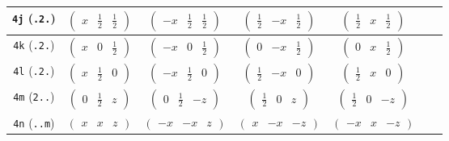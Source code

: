 \documentclass[fleqn,9pt,landscape]{jsarticle}
\begin{document}
\begin{center}
\begin{longtable}{ccccccc}
{\tt 4j} ({\tt .2.}) & $ \begin{pmatrix} x & \frac{1}{2} & \frac{1}{2} \end{pmatrix} $ & $ \begin{pmatrix} - x & \frac{1}{2} & \frac{1}{2} \end{pmatrix} $ & $ \begin{pmatrix} \frac{1}{2} & - x & \frac{1}{2} \end{pmatrix} $ & $ \begin{pmatrix} \frac{1}{2} & x & \frac{1}{2} \end{pmatrix} $ & $  $ & $  $ \\ \hline
{\tt 4k} ({\tt .2.}) & $ \begin{pmatrix} x & 0 & \frac{1}{2} \end{pmatrix} $ & $ \begin{pmatrix} - x & 0 & \frac{1}{2} \end{pmatrix} $ & $ \begin{pmatrix} 0 & - x & \frac{1}{2} \end{pmatrix} $ & $ \begin{pmatrix} 0 & x & \frac{1}{2} \end{pmatrix} $ & $  $ & $  $ \\ \hline
{\tt 4l} ({\tt .2.}) & $ \begin{pmatrix} x & \frac{1}{2} & 0 \end{pmatrix} $ & $ \begin{pmatrix} - x & \frac{1}{2} & 0 \end{pmatrix} $ & $ \begin{pmatrix} \frac{1}{2} & - x & 0 \end{pmatrix} $ & $ \begin{pmatrix} \frac{1}{2} & x & 0 \end{pmatrix} $ & $  $ & $  $ \\ \hline
{\tt 4m} ({\tt 2..}) & $ \begin{pmatrix} 0 & \frac{1}{2} & z \end{pmatrix} $ & $ \begin{pmatrix} 0 & \frac{1}{2} & - z \end{pmatrix} $ & $ \begin{pmatrix} \frac{1}{2} & 0 & z \end{pmatrix} $ & $ \begin{pmatrix} \frac{1}{2} & 0 & - z \end{pmatrix} $ & $  $ & $  $ \\ \hline
{\tt 4n} ({\tt ..m}) & $ \begin{pmatrix} x & x & z \end{pmatrix} $ & $ \begin{pmatrix} - x & - x & z \end{pmatrix} $ & $ \begin{pmatrix} x & - x & - z \end{pmatrix} $ & $ \begin{pmatrix} - x & x & - z \end{pmatrix} $ & $  $ & $  $ \\ \hline

\end{longtable}
\end{center}
\end{document}
